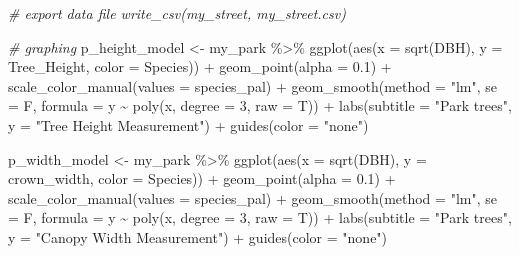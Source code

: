 \documentclass[12pt,twoside]{reedthesis}
\newenvironment{Shaded}{\begin{snugshade}}{\end{snugshade}}
\newcommand{\AttributeTok}[1]{\textcolor[rgb]{0.77,0.63,0.00}{#1}}
\newcommand{\CommentTok}[1]{\textcolor[rgb]{0.56,0.35,0.01}{\textit{#1}}}
\newcommand{\DecValTok}[1]{\textcolor[rgb]{0.00,0.00,0.81}{#1}}
\newcommand{\FloatTok}[1]{\textcolor[rgb]{0.00,0.00,0.81}{#1}}
\newcommand{\FunctionTok}[1]{\textcolor[rgb]{0.00,0.00,0.00}{#1}}
\newcommand{\NormalTok}[1]{#1}
\newcommand{\OtherTok}[1]{\textcolor[rgb]{0.56,0.35,0.01}{#1}}
\newcommand{\SpecialCharTok}[1]{\textcolor[rgb]{0.00,0.00,0.00}{#1}}
\newcommand{\StringTok}[1]{\textcolor[rgb]{0.31,0.60,0.02}{#1}}
\begin{document}
\begin{Shaded}
\begin{Highlighting}[]
\CommentTok{\# export data file write\_csv(my\_street, \textquotesingle{}my\_street.csv\textquotesingle{})}

\CommentTok{\# graphing}
\NormalTok{p\_height\_model }\OtherTok{\textless{}{-}}\NormalTok{ my\_park }\SpecialCharTok{\%\textgreater{}\%}
    \FunctionTok{ggplot}\NormalTok{(}\FunctionTok{aes}\NormalTok{(}\AttributeTok{x =} \FunctionTok{sqrt}\NormalTok{(DBH), }\AttributeTok{y =}\NormalTok{ Tree\_Height, }\AttributeTok{color =}\NormalTok{ Species)) }\SpecialCharTok{+}
    \FunctionTok{geom\_point}\NormalTok{(}\AttributeTok{alpha =} \FloatTok{0.1}\NormalTok{) }\SpecialCharTok{+} \FunctionTok{scale\_color\_manual}\NormalTok{(}\AttributeTok{values =}\NormalTok{ species\_pal) }\SpecialCharTok{+}
    \FunctionTok{geom\_smooth}\NormalTok{(}\AttributeTok{method =} \StringTok{"lm"}\NormalTok{, }\AttributeTok{se =}\NormalTok{ F, }\AttributeTok{formula =}\NormalTok{ y }\SpecialCharTok{\textasciitilde{}} \FunctionTok{poly}\NormalTok{(x,}
        \AttributeTok{degree =} \DecValTok{3}\NormalTok{, }\AttributeTok{raw =}\NormalTok{ T)) }\SpecialCharTok{+} \FunctionTok{labs}\NormalTok{(}\AttributeTok{subtitle =} \StringTok{"Park trees"}\NormalTok{,}
    \AttributeTok{y =} \StringTok{"Tree Height Measurement"}\NormalTok{) }\SpecialCharTok{+} \FunctionTok{guides}\NormalTok{(}\AttributeTok{color =} \StringTok{"none"}\NormalTok{)}

\NormalTok{p\_width\_model }\OtherTok{\textless{}{-}}\NormalTok{ my\_park }\SpecialCharTok{\%\textgreater{}\%}
    \FunctionTok{ggplot}\NormalTok{(}\FunctionTok{aes}\NormalTok{(}\AttributeTok{x =} \FunctionTok{sqrt}\NormalTok{(DBH), }\AttributeTok{y =}\NormalTok{ crown\_width, }\AttributeTok{color =}\NormalTok{ Species)) }\SpecialCharTok{+}
    \FunctionTok{geom\_point}\NormalTok{(}\AttributeTok{alpha =} \FloatTok{0.1}\NormalTok{) }\SpecialCharTok{+} \FunctionTok{scale\_color\_manual}\NormalTok{(}\AttributeTok{values =}\NormalTok{ species\_pal) }\SpecialCharTok{+}
    \FunctionTok{geom\_smooth}\NormalTok{(}\AttributeTok{method =} \StringTok{"lm"}\NormalTok{, }\AttributeTok{se =}\NormalTok{ F, }\AttributeTok{formula =}\NormalTok{ y }\SpecialCharTok{\textasciitilde{}} \FunctionTok{poly}\NormalTok{(x,}
        \AttributeTok{degree =} \DecValTok{3}\NormalTok{, }\AttributeTok{raw =}\NormalTok{ T)) }\SpecialCharTok{+} \FunctionTok{labs}\NormalTok{(}\AttributeTok{subtitle =} \StringTok{"Park trees"}\NormalTok{,}
    \AttributeTok{y =} \StringTok{"Canopy Width Measurement"}\NormalTok{) }\SpecialCharTok{+} \FunctionTok{guides}\NormalTok{(}\AttributeTok{color =} \StringTok{"none"}\NormalTok{)}


\end{Highlighting}
\end{Shaded}
\end{document}
